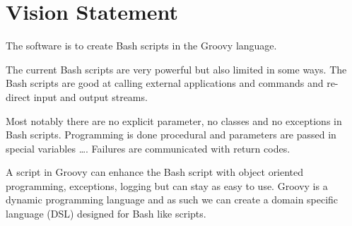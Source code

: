 \section{Vision Statement}

The software is to create Bash scripts in the Groovy language.

The current Bash scripts are very powerful but also limited in some ways.
The Bash scripts are good at calling external applications and commands and
re-direct input and output streams.

Most notably there are no explicit parameter, no classes and no exceptions
in Bash scripts. Programming is done procedural and parameters are passed in
special variables \dots{}. Failures are communicated with
return codes.

A script in Groovy can enhance the Bash script with object oriented programming,
exceptions, logging but can stay as easy to use. Groovy is a dynamic programming
language and as such we can create a domain specific language (DSL) designed for
Bash like scripts.
